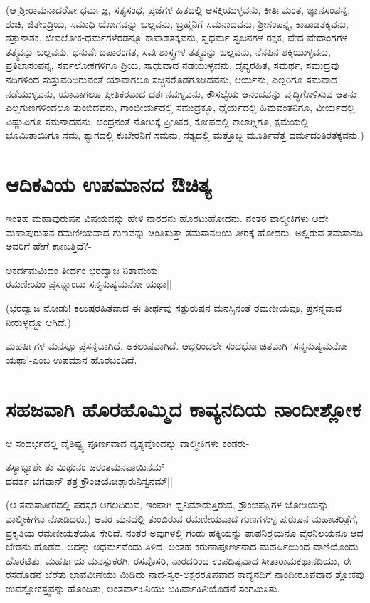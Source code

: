 (ಆ ಶ್ರೀರಾಮನಾದರೋ ಧರ್ಮಜ್ಞ, ಸತ್ಯಸಂಧ, ಪ್ರಜೆಗಳ ಹಿತದಲ್ಲಿ ಆಸಕ್ತಿಯುಳ್ಳವನು, ಕೀರ್ತಿಮಂತ, ಜ್ಞಾನಸಂಪನ್ನ, ಶುಚಿ, ಜಿತೇಂದ್ರಿಯ, ಸಮಾಧಿ ಯೋಗವನ್ನು ಬಲ್ಲವನು, ಬ್ರಹ್ಮನಿಗೆ ಸಮನಾದವನು, ಶ್ರೀಸಂಪನ್ನ, ಕಾಪಾಡತಕ್ಕವನು, ಶತ್ರುನಾಶಕ, ಜೀವಲೋಕ-ಧರ್ಮಗಳೆರಡನ್ನೂ ಕಾಪಾಡತಕ್ಕವನು, ಸ್ವಧರ್ಮ ಸ್ವಜನಗಳ ರಕ್ಷಕ, ವೇದ ವೇದಾಂಗಗಳ ತತ್ತ್ವವನ್ನು ಬಲ್ಲವನು, ಧನುರ್ವೆದಪಾರಂಗತ, ಸರ್ವಶಾಸ್ತ್ರಗಳ ತತ್ತ್ವವನ್ನು ಬಲ್ಲವನು, ನೆನಪಿನ ಶಕ್ತಿಯುಳ್ಳವನು, ಪ್ರತಿಭಾಸಂಪನ್ನ, ಸರ್ವಲೋಕಗಳಿಗೂ ಪ್ರಿಯ, ಸಾಧುವಾದ ನಡೆಯುಳ್ಳವನು, ದೈನ್ಯರಹಿತ, ಸಮರ್ಥ, ಸಮುದ್ರವು ನದಿಗಳಿಂದ ಸುತ್ತುವರಿದಿರುವಂತೆ ಯಾವಾಗಲೂ ಸಜ್ಜನರೊಡಗೂಡಿದವನು, ಆರ್ಯನು, ಎಲ್ಲರಿಗೂ ಸಮವಾದ ನಡೆಯುಳ್ಳವನು, ಯಾವಾಗಲೂ ಪ್ರೀತಿಕರವಾದ ದರ್ಶನವುಳ್ಳವನು, ಕೌಸಲ್ಯೆಯ ಆನಂದವನ್ನು ವೃದ್ಧಿಗೊಳಿಸುವ ಆತನು ಎಲ್ಲಗುಣಗಳಿಂದಲೂ ತುಂಬಿದವನು, ಗಾಂಭೀರ್ಯದಲ್ಲಿ ಸಮುದ್ರಕ್ಕೂ, ಧೈರ್ಯದಲ್ಲಿ ಹಿಮವಂತನಿಗೂ, ವೀರ್ಯದಲ್ಲಿ ವಿಷ್ಣುವಿಗೂ ಸಮನಾದವನು, ಚಂದ್ರನಂತೆ ನೋಟಕ್ಕೆ ಪ್ರೀತಿಕರ, ಕೋಪದಲ್ಲಿ ಕಾಲಾಗ್ನಿಗೂ, ಕ್ಷಮೆಯಲ್ಲಿ ಭೂಮಿತಾಯಿಗೂ ಸಮ, ತ್ಯಾಗದಲ್ಲಿ ಕುಬೇರನಿಗೆ ಸಮನು, ಸತ್ಯದಲ್ಲಿ ಮತ್ತೊಬ್ಬ ಮೂರ್ತಿವೆತ್ತ ಧರ್ಮದಂತಿರತಕ್ಕವನು.) 

\section*{ಆದಿಕವಿಯ ಉಪಮಾನದ ಔಚಿತ್ಯ} 

ಇಂತಹ ಮಹಾಪುರುಷನ ವಿಷಯವನ್ನು ಹೇಳಿ ನಾರದನು ಹೊರಟುಹೋದನು. ನಂತರ ವಾಲ್ಮೀಕಿಗಳು ಅದೇ ಮಹಾಪುರುಷನ ರಮಣೀಯವಾದ ಗುಣವನ್ನು ಚಿಂತಿಸುತ್ತಾ ತಮಸಾನದಿಯ ತೀರಕ್ಕೆ ಹೋದರು. ಅಲ್ಲಿರುವ ತಮಸಾನದಿ ಅವರಿಗೆ ಹೇಗೆ ಕಾಣುತ್ತಿದೆ?- 

\begin{shloka} 
ಅಕರ್ದಮಮಿದಂ ತೀರ್ಥಂ ಭರದ್ವಾಜ ನಿಶಾಮಯ|\\ 
ರಮಣೀಯಂ ಪ್ರಸನ್ನಾಂಬು ಸನ್ಮನುಷ್ಯಮನೋ ಯಥಾ||
\end{shloka} 

(ಭರದ್ವಾಜ ನೋಡು! ಕಲುಷರಹಿತವಾದ ಈ ತೀರ್ಥವು ಸತ್ಪುರುಷನ ಮನಸ್ಸಿನಂತೆ ರಮಣೀಯವೂ, ಪ್ರಸನ್ನವಾದ ನೀರುಳ್ಳದ್ದೂ ಆಗಿದೆ.) 

ಮಹರ್ಷಿಗಳ ಮನಸ್ಸೂ ಪ್ರಸನ್ನವಾಗಿದೆ. ಅಕಲುಷವಾಗಿದೆ. ಆದ್ದರಿಂದಲೇ ಸಂದರ್ಭೊಚಿತವಾಗಿ `ಸನ್ಮನುಷ್ಯಮನೋ ಯಥಾ'-ಎಂಬ ಉಪಮಾನ ಹೊರಬಂದಿದೆ. 

\section*{ಸಹಜವಾಗಿ ಹೊರಹೊಮ್ಮಿದ ಕಾವ್ಯನದಿಯ ನಾಂದೀಶ್ಲೋಕ} 

ಆ ಸಂದರ್ಭದಲ್ಲಿ ವೈಶಿಷ್ಟ್ಯ ಪೂರ್ಣವಾದ ದೃಶ್ಯವೊಂದನ್ನು ವಾಲ್ಮೀಕಿಗಳು ಕಂಡರು- 

\begin{shloka} 
ತಸ್ಯಾಭ್ಯಾಶೇ ತು ಮಿಥುನಂ ಚರಂತಮನಪಾಯಿನಮ್‍|\\ 
ದದರ್ಶ ಭಗವಾನ್ ತತ್ರ ಕ್ರೌಂಚಯೋಶ್ಚಾರುನಿಸ್ವನಮ್‍||
\end{shloka} 

(ಆ ತಮಸಾತೀರದಲ್ಲಿ ಪರಸ್ಪರ ಅಗಲದಿರುವ, ಇಂಪಾಗಿ ಧ್ವನಿಮಾಡುತ್ತಿರುವ, ಕ್ರೌಂಚಪಕ್ಷಿಗಳ ಜೋಡಿಯನ್ನು ವಾಲ್ಮೀಕಿಗಳು ನೋಡಿದರು.) ಅವರ ಮನದಲ್ಲಿ ತುಂಬಿರುವ ರಮಣೀಯವಾದ ಗುಣಗಳುಳ್ಳ ಪುರುಷನ ಮಹಾಚರಿತ್ರೆಗೆ, ಪ್ರಕೃತಿಯ ರಮಣೀಯತೆಯೂ ಸೇರಿದೆ. ನಂತರ ಅವುಗಳಲ್ಲಿ ಗಂಡು ಹಕ್ಕಿಯನ್ನು ಪಾಪನಿಶ್ಚಯನೂ ವೈರನಿಲಯನೂ ಆದ ಬೇಡನು ಹೊಡೆದ. ಅದನ್ನು ಅಧರ್ಮವೆಂದು ತಿಳಿದ, ಅಂತಹ ಕರುಣಾಪೂರ್ಣನಾದ ಮಹರ್ಷಿಯಿಂದ ವಾಣಿಯೊಂದು ಹೊರಟಿತು. ಮಹರ್ಷಿಯ ಮನಸ್ಸುಕರಗಿ, ರಸವೊಸರಿ, ನಾರದರಿಂದ ಉಪದಿಷ್ಟವಾದ ಸೀತಾರಾಮಕಥಾನದಿಯು, ಈ ರಸದೊಡನೆ ಬೆರೆತು ಭಾವವೀಣೆಯು ಮಿಡಿದು ನಾದ-ಸ್ವರ-ಅಕ್ಷರರೂಪವಾದ ಕಾವ್ಯನದಿಗೆ ನಾಂದೀರೂಪವಾದ ಶ್ಲೋಕವು ಉಪಶ್ಲೋಕತ್ತ್ವವನ್ನು ಹೊಂದಿತು, ಅಂತರ್ವಾಹಿನಿಯು ಬಹಿರ್ವಾಹಿನಿಯೊಡನೆ ಸಂಗಮಿಸಿತು. 

